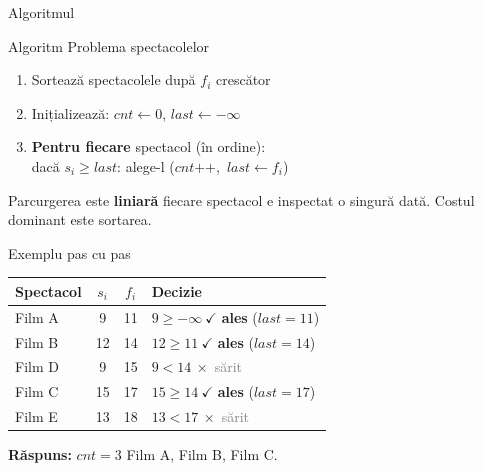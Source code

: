 \documentclass{beamer}
\begin{document}
\begin{frame}{Algoritmul}
  \begin{block}{Algoritm \textemdash{} Problema spectacolelor}
    \begin{enumerate}\itemsep6pt
      \item Sortează spectacolele după $f_i$ crescător
      \item Inițializează: $\mathit{cnt} \leftarrow 0$,\quad
            $\mathit{last} \leftarrow -\infty$
      \item \textbf{Pentru fiecare} spectacol (în ordine):\\
            dacă $s_i \geq \mathit{last}$:
            alege-l \quad ($\mathit{cnt}\texttt{++}$,\ $\mathit{last} \leftarrow f_i$)
    \end{enumerate}
  \end{block}
  \smallskip
  Parcurgerea este \textbf{liniară} \textemdash{} fiecare spectacol e inspectat o singură dată.
  Costul dominant este sortarea.
\end{frame}

\begin{frame}{Exemplu pas cu pas}
  \begin{center}
  \end{center}
  \smallskip
  \begin{center}
  {\footnotesize
  \begin{tabular}{lccl}
    \toprule
    Spectacol & $s_i$ & $f_i$ & Decizie \\
    \midrule
    Film A & 9  & 11 & $9 \geq -\infty\ \checkmark$ \quad \textbf{ales} \quad ($\mathit{last}=11$) \\
    Film B & 12 & 14 & $12 \geq 11\ \checkmark$ \quad \textbf{ales} \quad ($\mathit{last}=14$) \\
    Film D & 9  & 15 & $9 < 14\ \times$ \quad \textcolor{gray}{sărit} \\
    Film C & 15 & 17 & $15 \geq 14\ \checkmark$ \quad \textbf{ales} \quad ($\mathit{last}=17$) \\
    Film E & 13 & 18 & $13 < 17\ \times$ \quad \textcolor{gray}{sărit} \\
    \bottomrule
  \end{tabular}}
  \end{center}
  \smallskip
  \textbf{Răspuns:} $\mathit{cnt} = 3$ \textemdash{} Film A, Film B, Film C.
\end{frame}
\end{document}
